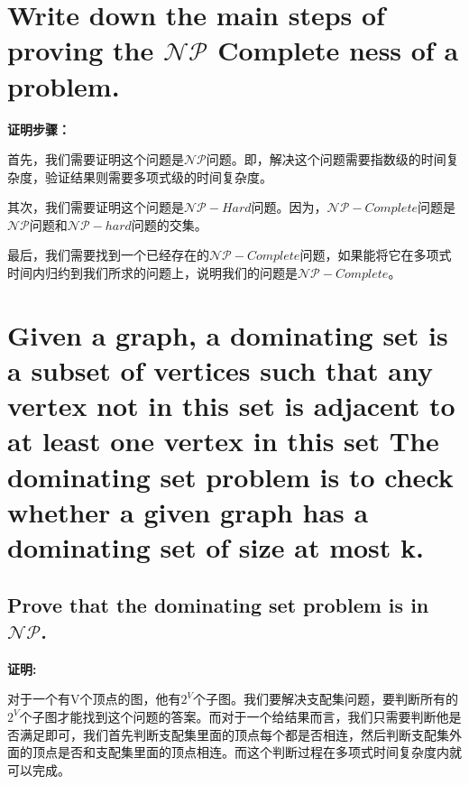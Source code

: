 \documentclass[]{article}
\begin{document}
\begin{multicols}{2} 
\section{Write down the main steps of proving the $\mathcal{NP}$ Complete ness of a problem.}


{\large \textbf{证明步骤：}
	
	首先，我们需要证明这个问题是$\mathcal{NP}$问题。即，解决这个问题需要指数级的时间复杂度，验证结果则需要多项式级的时间复杂度。
	
	其次，我们需要证明这个问题是$\mathcal{NP}-Hard$问题。因为，$\mathcal{NP}-Complete$问题是$\mathcal{NP}$问题和$\mathcal{NP}-hard$问题的交集。
	
	最后，我们需要找到一个已经存在的$\mathcal{NP}-Complete$问题，如果能将它在多项式时间内归约到我们所求的问题上，说明我们的问题是$\mathcal{NP}-Complete$。}



\section{Given a graph, a dominating set is a subset of vertices such that any vertex not in this set is adjacent to at least one vertex in this set The dominating set problem is to check whether a given graph has a dominating set of size at most k.}



\subsection*{ Prove that the dominating set problem is in $\mathcal{NP}$.}
{\large \textbf{证明:}
	
	对于一个有V个顶点的图，他有$2^V$个子图。我们要解决支配集问题，要判断所有的$2^V$个子图才能找到这个问题的答案。而对于一个给结果而言，我们只需要判断他是否满足即可，我们首先判断支配集里面的顶点每个都是否相连，然后判断支配集外面的顶点是否和支配集里面的顶点相连。而这个判断过程在多项式时间复杂度内就可以完成。
	
}
\end{multicols}
\end{document}
